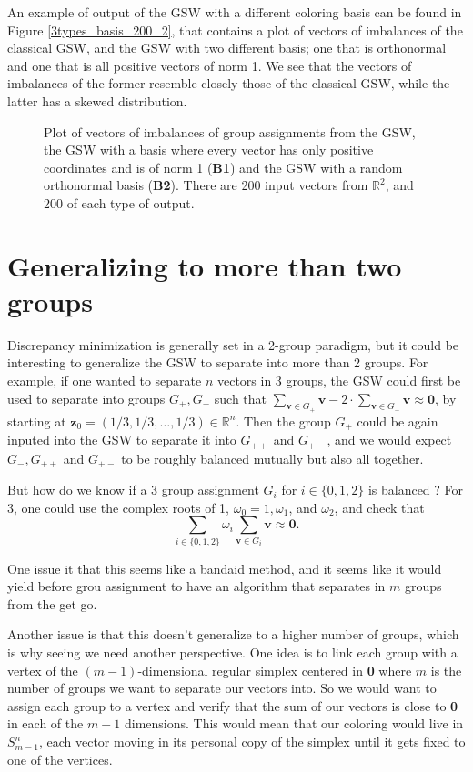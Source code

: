 \documentclass[12pt]{article}
\begin{document}
An example of output of the GSW with a different coloring basis can be found in Figure \ref{3types_basis_200_2}, that contains a plot of vectors of imbalances of the classical GSW, and the GSW with two different basis; one that is orthonormal and one that is all positive vectors of norm 1. We see that the vectors of imbalances of the former resemble closely those of the classical GSW, while the latter has a skewed distribution. 
\begin{figure}[h]

\caption{Plot of vectors of imbalances of group assignments from the GSW, the GSW with a basis where every vector has only positive coordinates and is of norm 1 (\textbf{B1}) and the GSW with a random orthonormal basis (\textbf{B2}). There are 200 input vectors from $\mathbb{R}^2$, and 200 of each type of output. }\label{3_types_basis}
\end{figure}

\section{Generalizing to more than two groups}
Discrepancy minimization is generally set in a 2-group paradigm, but it could be interesting to generalize the GSW to separate into more than 2 groups. For example, if one wanted to separate $n$ vectors in 3 groups, the GSW could first be used to separate into groups $G_+,G_-$ such that $\sum_{\textbf{v}\in G_+}\textbf{v}-2\cdot\sum_{\textbf{v}\in G_-}\textbf{v}\approx \textbf{0}$, by starting at $\textbf{z}_0=(1/3,1/3,\dots,1/3)\in\mathbb{R}^n$. Then the group $G_+$ could be again inputed into the GSW to separate it into $G_{++}$ and $G_{+-}$, and we would expect $G_-,G_{++}$ and $G_{+-}$ to be roughly balanced mutually but also all together.

But how do we know if a 3 group assignment $G_i$ for $i\in\{0,1,2\}$ is balanced ? For 3, one could use the complex roots of 1, $\omega_0=1 ,\omega_1$, and $\omega_2$, and check that $$\sum_{i\in\{0,1,2\}}\omega_i\sum_{\textbf{v}\in G_i}\textbf{v}\approx\textbf{0}.$$

One issue it that this seems like a bandaid method, and it seems like it would yield before grou assignment to have an algorithm that separates in $m$ groups from the get go.

Another issue is that this doesn't generalize to a higher number of groups, which is why seeing we need another perspective. One  idea is to link each group with a vertex of the $(m-1)$-dimensional regular simplex centered in \textbf{0} where $m$ is the number of groups we want to separate our vectors into. So we would want to assign each group to a vertex and verify that the sum of our vectors is close to \textbf{0} in each of the $m-1$ dimensions. This would mean that our coloring would live in $S_{m-1}^n$, each vector moving in its personal copy of the simplex until it gets fixed to one of the vertices.
\end{document}
